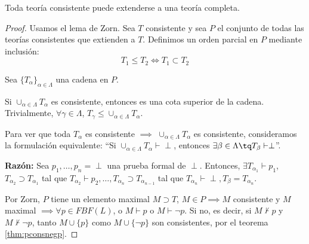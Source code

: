 \begin{theorem}
	Toda teoría consistente puede extenderse a una teoría completa.
	\label{thm:lindenbaum}
\end{theorem}
\begin{proof}
	Usamos el lema de Zorn. Sea $T$ consistente y sea $P$ el conjunto de todas las teorías consistentes que extienden a $T$. Definimos un orden parcial en $P$ mediante inclusión:
	$$T_1\le T_2 \iff T_1\subset T_2$$ 
	
	Sea $\{T_\alpha\}_{\alpha\in\Lambda}$ una cadena en $P$.
	
	Si $\cup_{\alpha\in\Lambda} T_\alpha$ es consistente, entonces es una cota superior de la cadena. Trivialmente, $\forall\gamma\in\Lambda$, $T_\gamma \le \cup_{\alpha \in \Lambda} T_\alpha$.
	
	Para ver que toda $T_\alpha$ es consistente $\implies$ $\cup_{\alpha\in\Lambda}T_\alpha$ es consistente, consideramos la formulación equivalente: ``Si $\cup_{\alpha\in\Lambda}T_\alpha \vdash \perp$, entonces $\exists \beta\in\Lambda \tq T_\beta \vdash \perp$''.
	
	\textbf{Razón:} Sea $p_1,\hdots,p_n = \perp$ una prueba formal de $\perp$. Entonces, $\exists T_{\alpha_1}\vdash p_1$, $T_{\alpha_2} \supset T_{\alpha_1}$ tal que $T_{\alpha_2}\vdash p_2, \hdots, T_{\alpha_n}\supset T_{\alpha_{n-1}}$ tal que $T_{\alpha_n}\vdash \perp, T_\beta = T_{\alpha_n}$.
	
	Por Zorn, $P$ tiene un elemento maximal $M\supset T$, $M\in P \implies M$ consistente y $M$ maximal $\implies\forall p \in FBF(L)$, o $M\vdash p$ o $M\vdash \neg p$. Si no, es decir, si $M\nvdash p$ y $M\nvdash \neg p$, tanto $M\cup\{p\}$ como $M\cup\{\neg p\}$ son consistentes, por el teorema \ref{thm:pconsnegp}.
\end{proof}

